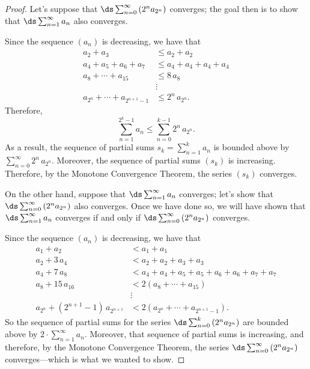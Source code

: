 \begin{proof}
  Let's suppose that $\ds\sum_{n=0}^\infty \left( 2^n a_{2^n} \right)$
  converges; the goal then is to show that $\ds\sum_{n=1}^\infty a_n$
  also converges.

  Since the sequence $(a_n)$ is decreasing, we have that
  \begin{align*}
  a_2 + a_3 &\leq a_2 + a_2 \\
  a_4 + a_5 + a_6 + a_7 &\leq a_4 + a_4 + a_4 + a_4 \\
  a_8 + \cdots + a_{15} &\leq 8 \, a_8 \\
  &\vdots \\
  a_{2^n} + \cdots + a_{2^{n+1} - 1} &\leq 2^n \, a_{2^n}.
  \end{align*}
  Therefore,
  $$
  \sum_{n=1}^{2^k - 1} a_n \leq \sum_{n=0}^{k-1} 2^n \, a_{2^n}.
  $$
  As a result, the sequence of partial sums $s_k = \sum_{n=1}^k a_n$ is bounded above by $\sum_{n=0}^\infty 2^n \, a_{2^n}$.  Moreover, the sequence of partial sums $(s_k)$ is increasing.  Therefore, by the Monotone Convergence Theorem, the series $(s_k)$ converges.

  On the other hand, suppose that $\ds\sum_{n=1}^\infty a_n$ converges; let's show that $\ds\sum_{n=0}^\infty \left( 2^n a_{2^n} \right)$
  also converges.  Once we have done so, we will have shown that  $\ds\sum_{n=1}^\infty a_n$ converges if and only if $\ds\sum_{n=0}^\infty \left( 2^n a_{2^n} \right)$ converges.

  Since the sequence $(a_n)$ is decreasing, we have that
  \begin{align*}
  a_1 + a_2 &< a_1 + a_1 \\
  a_2 + 3\,a_4 &< a_2 + a_2 + a_3 + a_3 \\
  a_4 + 7 \, a_8 &< a_4 + a_4 + a_5 + a_5 + a_6 + a_6 + a_7 + a_7 \\
  a_8 + 15 \, a_{16} &< 2(a_8 + \cdots + a_{15}) \\
  &\vdots \\
  a_{2^n} + (2^{n+1} - 1) \, a_{2^{n+1}} &< 2(a_{2^{n}} + \cdots + a_{2^{n+1} - 1}).
  \end{align*}
  So the sequence of partial sums for the series $\ds\sum_{n=0}^k \left( 2^n a_{2^n} \right)$ are bounded above by $2 \cdot \sum_{n=1}^\infty a_n$.  Moreover, that sequence of partial sums is increasing, and therefore, by the Monotone Convergence Theorem, the series $\ds\sum_{n=0}^\infty \left( 2^n a_{2^n} \right)$ converges---which is what we wanted to show.  
\end{proof}

